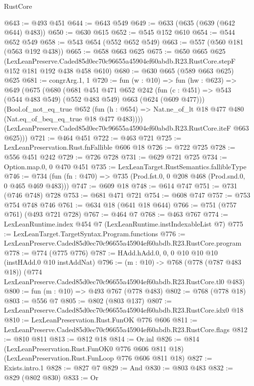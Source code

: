 \begin{lexlean}{RustCore}
\begin{coremodule}
@643 := @493 @451
@644 := @643 @549
@649 := @633 (@635 (@639 (@642 @644) @483))
@650 := @630 @615
@652 := @545 @152 @610
@654 := @544 @652 @549
@658 := @543 @654 (@552 @652 @549)
@663 := @557 (@560 @181 (@563 @192 @438))
@665 := @658 @663 @625
@675 := @650
    @665
    @625
    (LexLeanPreserve.Caded85d0ec70c96655a45904ef60abdb.R23.RustCore.stepF
      @152
      @181
      @192
      @438
      @458
      @610)
@680 := @630 @665 (@589 @663 @625) @625
@681 := congrArg.{1, 1}
@720 := fun (w : @10) =>
  fun (hw : @623) =>
  @649
    (@675
      (@680
        (@681
          @451
          @471
          @652
          @242
          (fun (c : @451) => @543 (@544 @483 @549) (@552 @483 @549) @663 (@624 (@609 @477)))
          (Bool.of_not_eq_true
            @652
            (fun (h : @654) => Nat.ne_of_lt @18 @477 @480 (Nat.eq_of_beq_eq_true @18 @477 @483))))
        (LexLeanPreserve.Caded85d0ec70c96655a45904ef60abdb.R23.RustCore.iteF @663 @625)))
@721 := @464 @451
@722 := @463 @721
@725 := LexLeanPreservation.Rust.fnFallible @606 @18
@726 := @722 @725
@728 := @556 @451 @242
@729 := @726 @728
@731 := @629 @721 @725
@734 := Option.map.{0, 0} @470 @451
@735 := LexLeanTarget.RustSemantics.fallibleType
@746 := @734 (fun (fn : @470) => @735 (Prod.fst.{0, 0} @208 @468 (Prod.snd.{0, 0} @465 @469 @483)))
@747 := @609 @18
@748 := @614 @747
@751 := @731 (@746 @748) @728
@753 := @681 @471 @721
@754 := @608 @747
@757 := @753 @754 @748 @746
@761 := @634 @18 (@641 @18 @644)
@766 := @751 (@757 @761) (@493 @721 @728)
@767 := @464 @7
@768 := @463 @767
@774 := LexLeanRuntime.index @454 @7 (LexLeanRuntime.instIndexableList @7)
@775 := LexLeanTarget.TargetSyntax.Program.functions
@776 := LexLeanPreserve.Caded85d0ec70c96655a45904ef60abdb.R23.RustCore.program
@778 := @774 (@775 @776)
@787 := HAdd.hAdd.{0, 0, 0} @10 @10 @10 (instHAdd.{0} @10 instAddNat)
@796 := (m : @10) ->
  @768
    (@778 (@787 @483 @18))
    (@774 LexLeanPreserve.Caded85d0ec70c96655a45904ef60abdb.R23.RustCore.tl0 @483)
@800 := fun (m : @10) => @493 @767 (@778 @483)
@802 := @768 (@778 @18)
@803 := @556 @7
@805 := @802 (@803 @137)
@807 := LexLeanPreserve.Caded85d0ec70c96655a45904ef60abdb.R23.RustCore.idx0 @18
@810 := LexLeanPreservation.Rust.FunOK @776 @606
@811 := LexLeanPreserve.Caded85d0ec70c96655a45904ef60abdb.R23.RustCore.flags
@812 := @810 @811
@813 := @812 @18
@814 := Or.inl
@826 := @814
    (LexLeanPreservation.Rust.FunOK0 @776 @606 @811 @18)
    (LexLeanPreservation.Rust.FunLoop @776 @606 @811 @18)
@827 := Exists.intro.{1}
@828 := @827 @7
@829 := And
@830 := @803 @483
@832 := @829 (@802 @830)
@833 := Or

\end{coremodule}
\end{lexlean}
